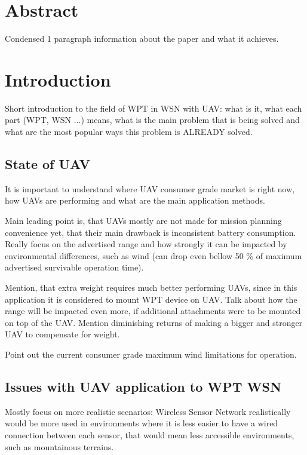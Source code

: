 \documentclass[11pt,a4paper,footinclude=true,headinclude=true, oneside]{scrbook}
\begin{document}
\chapter{Abstract}

Condensed 1 paragraph information about the paper and what it achieves.

\tableofcontents

\chapter{Introduction}

Short introduction to the field of WPT in WSN with UAV: what is it, what each part (WPT, WSN ...) means, what is the main problem that is being solved and what are the most popular ways this problem is ALREADY solved.

\section{State of UAV}

It is important to understand where UAV consumer grade market is right now, how UAVs are performing and what are the main application methods.

Main leading point is, that UAVs mostly are not made for mission planning convenience yet, that their main drawback is inconsistent battery consumption. Really focus on the advertised range and how strongly it can be impacted by environmental differences, such as wind (can drop even bellow 50 \% of maximum advertised survivable operation time).

Mention, that extra weight requires much better performing UAVs, since in this application it is considered to mount WPT device on UAV. Talk about how the range will be impacted even more, if additional attachments were to be mounted on top of the UAV. Mention diminishing returns of making a bigger and stronger UAV to compensate for weight.

Point out the current consumer grade maximum wind limitations for operation.

\section{Issues with UAV application to WPT WSN}

Mostly focus on more realistic scenarios: Wireless Sensor Network realistically would be more used in environments where it is less easier to have a wired connection between each sensor, that would mean less accessible environments, such as mountainous terrains.
\end{document}
